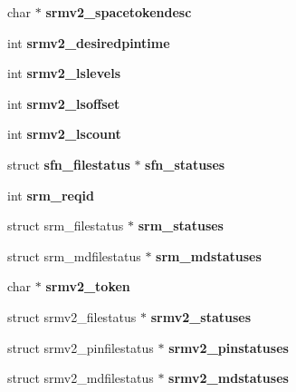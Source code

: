 \begin{DoxyCompactItemize}
\item 
char $\ast$ {\bfseries srmv2\_\-spacetokendesc}\label{structgfal__internal___ac27c883801b8fd5664b2f58480b06033}

\item 
int {\bfseries srmv2\_\-desiredpintime}\label{structgfal__internal___aa4f0b4ae8091042448be6d17d5f666db}

\item 
int {\bfseries srmv2\_\-lslevels}\label{structgfal__internal___a2ddeee60893e4dbec3767b43b0604d66}

\item 
int {\bfseries srmv2\_\-lsoffset}\label{structgfal__internal___a044446e667958c2b5934fb632d49d259}

\item 
int {\bfseries srmv2\_\-lscount}\label{structgfal__internal___a8883e4877fbbcaa8a8cf8cba53a93957}

\item 
struct {\bf sfn\_\-filestatus} $\ast$ {\bfseries sfn\_\-statuses}\label{structgfal__internal___a2014880ae0a2c45a3284f3a8e62237d6}

\item 
int {\bfseries srm\_\-reqid}\label{structgfal__internal___a6475927b7a38bd3fa2426a8b661e1449}

\item 
struct srm\_\-filestatus $\ast$ {\bfseries srm\_\-statuses}\label{structgfal__internal___a19fa24e7dea24fea2ad0608ad4cf4986}

\item 
struct srm\_\-mdfilestatus $\ast$ {\bfseries srm\_\-mdstatuses}\label{structgfal__internal___a6d6794ff122e68c211d02efe21b19dd3}

\item 
char $\ast$ {\bfseries srmv2\_\-token}\label{structgfal__internal___af96ba307ba84be1d9ef836514166de81}

\item 
struct srmv2\_\-filestatus $\ast$ {\bfseries srmv2\_\-statuses}\label{structgfal__internal___a658f48702c3957c09194152fd4f50a3e}

\item 
struct srmv2\_\-pinfilestatus $\ast$ {\bfseries srmv2\_\-pinstatuses}\label{structgfal__internal___a0a80272fb0c2198477395c98b9fdde70}

\item 
struct srmv2\_\-mdfilestatus $\ast$ {\bfseries srmv2\_\-mdstatuses}\label{structgfal__internal___af8e303a19e88cbc573d06b426969814f}


\end{DoxyCompactItemize}
